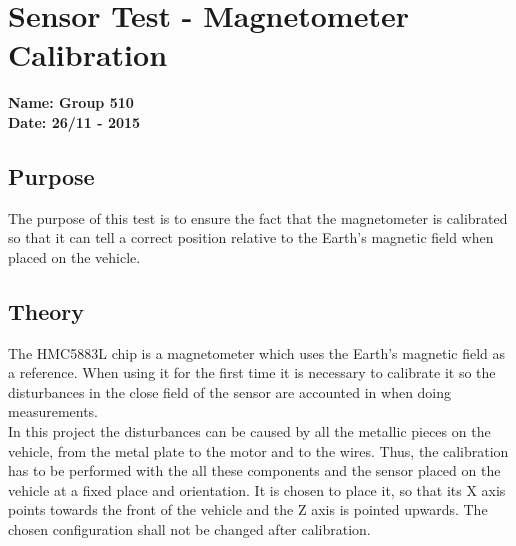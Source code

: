 \pagebreak
\section{Sensor Test - Magnetometer Calibration} \label{app:magnetoCalibration}
\textbf{Name: Group 510}\\
\textbf{Date: 26/11 - 2015}

\subsection{Purpose}
The purpose of this test is to ensure the fact that the magnetometer is calibrated so that it can tell a correct position relative to the Earth's magnetic field when placed on the vehicle.

\subsection{Theory}
The HMC5883L chip \cite{HMC5883L} is a magnetometer which uses the Earth's magnetic field as a reference. When using it for the first time it is necessary to calibrate it so the disturbances in the close field of the sensor are accounted in when doing measurements.\\
%
In this project the disturbances can be caused by all the metallic pieces on the vehicle, from the metal plate to the motor and to the wires. Thus, the calibration has to be performed with the all these components and the sensor placed on the vehicle at a fixed place and orientation. It is chosen to place it, so that its X axis points towards the front of the vehicle and the Z axis is pointed upwards. The chosen configuration shall not be changed after calibration.

